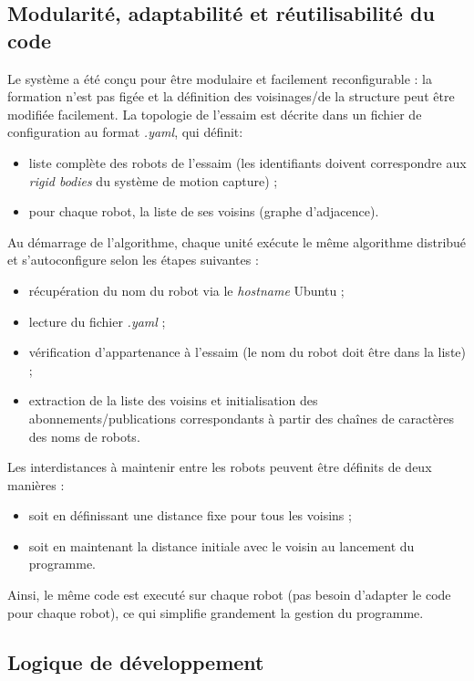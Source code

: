 \subsection{Modularité, adaptabilité et réutilisabilité du code}

Le système a été conçu pour être modulaire et facilement reconfigurable : la formation n’est pas figée et la définition des voisinages/de la structure peut être modifiée facilement. La topologie de l’essaim est décrite dans un fichier de configuration au format \textit{.yaml}, qui définit:
\begin{itemize}
    \item liste complète des robots de l’essaim (les identifiants doivent correspondre aux \textit{rigid bodies} du système de motion capture) ;
    \item pour chaque robot, la liste de ses voisins (graphe d’adjacence).
\end{itemize}
Au démarrage de l'algorithme, chaque unité exécute le même algorithme distribué et s’autoconfigure selon les étapes suivantes :
\begin{itemize}
    \item récupération du nom du robot via le \textit{hostname} Ubuntu ;
    \item lecture du fichier \textit{.yaml} ;
    \item vérification d’appartenance à l’essaim (le nom du robot doit être dans la liste) ;
    \item extraction de la liste des voisins et initialisation des abonnements/publications correspondants à partir des chaînes de caractères des noms de robots.
\end{itemize}
Les interdistances à maintenir entre les robots peuvent être définits de deux manières :
\begin{itemize}
    \item soit en définissant une distance fixe pour tous les voisins ;
    \item soit en maintenant la distance initiale avec le voisin au lancement du programme.
\end{itemize}
Ainsi, le même code est executé sur chaque robot (pas besoin d'adapter le code pour chaque robot), ce qui simplifie grandement la gestion du programme.

\subsection{Logique de développement}

